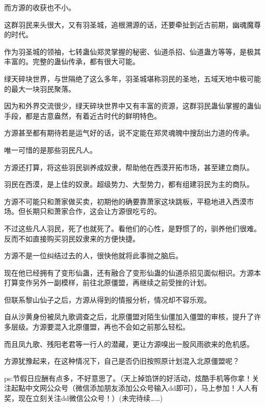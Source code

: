 \begin{this_body}
而方源的收获也不小。

这群羽民来头很大，又有羽圣城，追根溯源的话，还要牵扯到近古前期，幽魂魔尊的时代。

作为羽圣城的领袖，七转蛊仙郑灵掌握的秘密、仙道杀招、仙道蛊方等等，是极其丰富的。完整的蛊仙传承，都有很大可能。

绿天碎块世界，与世隔绝了这么多年，羽圣城堪称羽民的圣地，五域天地中极可能的最大一块羽民聚落。

因为和外界交流很少，绿天碎块世界中又有丰富的资源，这群羽民蛊仙掌握的蛊仙手段，都是古意盎然，有着近古时代的鲜明特色。

方源甚至都有期待若是运气好的话，说不定能在郑灵魂魄中搜刮出力道的传承。

唯一可惜的是那些羽民凡人。

方源还打算，将这些羽民驯养成奴隶，帮助他在西漠开拓市场，甚至建立商队。

羽民在西漠，是上佳的奴隶。超级势力、大型势力，都有组建羽民为主的商队。

方源不可能只和萧家做买卖，初期他的确要靠萧家这块跳板，平稳地进入西漠市场。但长期只和萧家合作，这会让方源很吃亏的。

不过这些凡人羽民，死了也就死了。看他们的心性，是野惯了的，驯养他们很难。反而不如直接购买羽民奴隶来的方便快捷。

方源不是一位纠结过去的人，很快他就将此事抛之脑后。

现在他已经拥有了变形仙蛊，还有融合了变形仙蛊的仙道杀招见面似相识。方源本打算变作另外一副模样，前往北原僵盟，再继续之前受挫的计划。

但联系黎山仙子之后，方源从得到的情报分析，情况却不容乐观。

自从沙黄身份被凤九歌调查之后，北原僵盟对陌生仙僵加入僵盟的审核，提升了许多层级。方源要混入北原僵盟，再也不会如之前那么轻松。

而且凤九歌、残阳老君等一行人的潜藏，更让方源嗅出一股风雨欲来的危机感。

方源犹豫起来，在这种情况下，自己是否仍旧按照原计划混入北原僵盟呢？

ps:节假日应酬有点多，不好意思了。（天上掉馅饼的好活动，炫酷手机等你拿！关注起點中文网公众号（微信添加朋友添加公众号输入dd即可），马上参加！人人有奖，现在立刻关注dd微信公众号！）(未完待续……)

\end{this_body}

